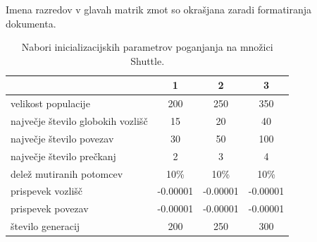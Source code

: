 Imena razredov v glavah matrik zmot so okrašjana zaradi formatiranja dokumenta.
\begin{table}[H]
    \caption{Nabori inicializacijskih parametrov poganjanja na množici Shuttle.}
    \begin{center}
        \begin{tabular}{||l c c c||}
            \hline
            & 1        & 2        & 3 \\ [0.5ex]
            \hline
            velikost populacije               & 200      & 250      & 350      \\
            \hline
            največje število globokih vozlišč & 15       & 20       & 40       \\
            \hline
            največje število povezav          & 30       & 50       & 100      \\
            \hline
            največje število prečkanj         & 2        & 3        & 4        \\
            \hline
            delež mutiranih potomcev          & 10\%     & 10\%     & 10\%     \\
            \hline
            prispevek vozlišč                 & -0.00001 & -0.00001 & -0.00001 \\
            \hline
            prispevek povezav                 & -0.00001 & -0.00001 & -0.00001 \\
            \hline
            število generacij                 & 200      & 250      & 300      \\
            \hline
        \end{tabular}
    \end{center}
    \label{tab:param_statlog}
\end{table}

